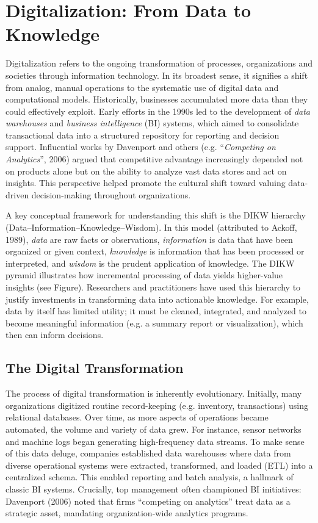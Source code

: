 \section{Digitalization: From Data to Knowledge}
Digitalization refers to the ongoing transformation of processes, organizations and societies through information technology. In its broadest sense, it signifies a shift from analog, manual operations to the systematic use of digital data and computational models.  Historically, businesses accumulated more data than they could effectively exploit. Early efforts in the 1990s led to the development of \emph{data warehouses} and \emph{business intelligence} (BI) systems, which aimed to consolidate transactional data into a structured repository for reporting and decision support.  Influential works by Davenport and others (e.g. “\emph{Competing on Analytics}”, 2006) argued that competitive advantage increasingly depended not on products alone but on the ability to analyze vast data stores and act on insights. This perspective helped promote the cultural shift toward valuing data-driven decision-making throughout organizations.

A key conceptual framework for understanding this shift is the DIKW hierarchy (Data--Information--Knowledge--Wisdom). In this model (attributed to Ackoff, 1989), \emph{data} are raw facts or observations, \emph{information} is data that have been organized or given context, \emph{knowledge} is information that has been processed or interpreted, and \emph{wisdom} is the prudent application of knowledge. The DIKW pyramid illustrates how incremental processing of data yields higher-value insights (see Figure). Researchers and practitioners have used this hierarchy to justify investments in transforming data into actionable knowledge. For example, data by itself has limited utility; it must be cleaned, integrated, and analyzed to become meaningful information (e.g. a summary report or visualization), which then can inform decisions.

\subsection{The Digital Transformation}
The process of digital transformation is inherently evolutionary. Initially, many organizations digitized routine record-keeping (e.g. inventory, transactions) using relational databases. Over time, as more aspects of operations became automated, the volume and variety of data grew. For instance, sensor networks and machine logs began generating high-frequency data streams. To make sense of this data deluge, companies established data warehouses where data from diverse operational systems were extracted, transformed, and loaded (ETL) into a centralized schema. This enabled reporting and batch analysis, a hallmark of classic BI systems. Crucially, top management often championed BI initiatives: Davenport (2006) noted that firms “competing on analytics” treat data as a strategic asset, mandating organization-wide analytics programs. 

